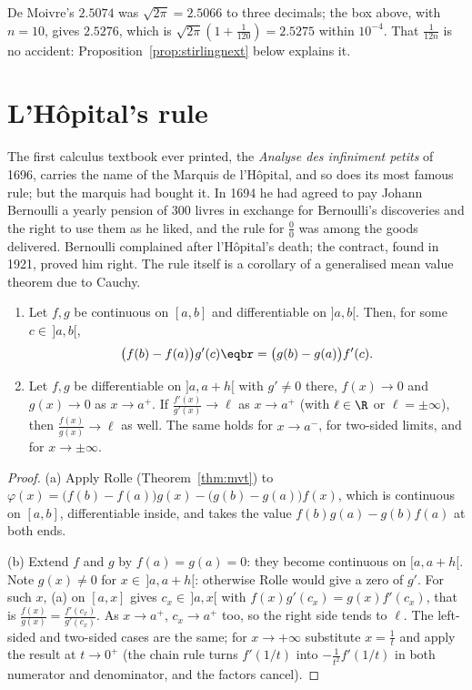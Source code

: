 De Moivre's $2.5074$ was $\sqrt{2\pi}=2.5066$ to three decimals; the box above, with $n=10$, gives $2.5276$, which is $\sqrt{2\pi}\left(1+\frac1{120}\right)=2.5275$ within $10^{-4}$. That $\frac1{12n}$ is no accident: Proposition~\ref{prop:stirlingnext} below explains it.

\section{L'H\^opital's rule}

The first calculus textbook ever printed, the \emph{Analyse des infiniment petits} of 1696, carries the name of the Marquis de l'H\^opital, and so does
its most famous rule; but the marquis had bought it. In 1694 he had agreed to pay Johann Bernoulli a yearly pension of 300 livres in exchange for
Bernoulli's discoveries and the right to use them as he liked, and the rule for $\frac00$ was among the goods delivered. Bernoulli complained after
l'H\^opital's death; the contract, found in 1921, proved him right. The rule itself is a corollary of a generalised mean value theorem due to Cauchy.

\begin{theorem}\label{thm:lhopital}
\begin{enumerate}[label=(\alph*)]
\item Let $f,g$ be continuous on $[a,b]$ and differentiable on $]a,b[$. Then, for some $c\in\,]a,b[$,
\[\begin{aligned}\bigl(f(b)-f(a)\bigr)g'(c)\eqbr=\bigl(g(b)-g(a)\bigr)f'(c).\end{aligned}\]
\item Let $f,g$ be differentiable on $]a,a+h[$ with $g'\ne0$ there, $f(x)\to0$ and $g(x)\to0$ as $x\to a^+$. If $\frac{f'(x)}{g'(x)}\to\ell$ as $x\to a^+$ (with $\ell\in\R$ or $\ell=\pm\infty$), then $\frac{f(x)}{g(x)}\to\ell$ as well. The same holds for $x\to a^-$, for two-sided limits, and for $x\to\pm\infty$.
\end{enumerate}
\end{theorem}
\begin{proof}
(a) Apply Rolle (Theorem~\ref{thm:mvt}) to $\varphi(x)=\bigl(f(b)-f(a)\bigr)g(x)-\bigl(g(b)-g(a)\bigr)f(x)$, which is continuous on $[a,b]$, differentiable inside, and takes the value $f(b)g(a)-g(b)f(a)$ at both ends.

(b) Extend $f$ and $g$ by $f(a)=g(a)=0$: they become continuous on $[a,a+h[$. Note $g(x)\ne0$ for $x\in\,]a,a+h[$: otherwise Rolle would give a zero of $g'$. For such $x$, (a) on $[a,x]$ gives $c_x\in\,]a,x[$ with $f(x)g'(c_x)=g(x)f'(c_x)$, that is $\frac{f(x)}{g(x)}=\frac{f'(c_x)}{g'(c_x)}$. As $x\to a^+$, $c_x\to a^+$ too, so the right side tends to $\ell$. The left-sided and two-sided cases are the same; for $x\to+\infty$ substitute $x=\frac1t$ and apply the result at $t\to0^+$ (the chain rule turns $f'(1/t)$ into $-\frac1{t^2}f'(1/t)$ in both numerator and denominator, and the factors cancel).
\end{proof}

